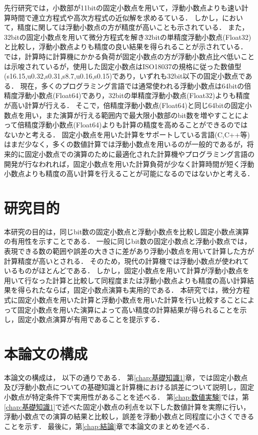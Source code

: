 先行研究では，小数部が11bitの固定小数点を用いて，浮動小数点よりも速い計算時間で連立方程式や高次方程式の近似解を求めるている\cite{IJERTV12IS010134}．
しかし，\cite{IJERTV12IS010134}において，精度に関しては浮動小数点の方が精度が高いことも示されている．
また，32bitの固定小数点を用いて微分方程式を解き32bitの単精度浮動小数点(Float32)と比較し，浮動小数点よりも精度の良い結果を得られることが示されている\cite{hopkins2020stochastic}．
\cite{hopkins2020stochastic}では，計算時に計算機にかかる負荷が固定小数点の方が浮動小数点比べ低いことは示唆されているが，使用した固定小数点はISO18037の規格に従った数値型(s16.15,u0.32,s0.31,s8.7,u0.16,s0.15)であり，いずれも32bit以下の固定小数点である．
現在，多くのプログラミング言語では通常使われる浮動小数点は64bitの倍精度浮動小数点(Float64)であり，32bitの単精度浮動小数点(Float32)よりも精度が高い計算が行える．
そこで，倍精度浮動小数点(Float64)と同じ64bitの固定小数点を用い，また演算が行える範囲内で最大限小数部のbit数を増やすことによって倍精度浮動小数点(Float64)よりも計算の精度を高めることができるのではないかと考える．
固定小数点を用いた計算をサポートしている言語(C,C++等)はまだ少なく，多くの数値計算では浮動小数点を用いるのが一般的であるが，将来的に固定小数点での演算のために最適化された計算機やプログラミング言語の開発が行なわれれば，固定小数点を用いた計算負荷が少なく計算時間が短く浮動小数点よりも精度の高い計算を行えることが可能になるのではないかと考える．

\section{研究目的}
本研究の目的は，同じbit数の固定小数点と浮動小数点を比較し固定小数点演算の有用性を示すことである．
一般に同じbit数の固定小数点と浮動小数点では，表現できる数の範囲や誤差の大きさに差があり浮動小数点を用いて計算した方が計算精度が高いとされる．
そのため，現代の計算機では浮動小数点が使われているものがほとんどである．
しかし，固定小数点を用いて計算が浮動小数点を用いて行なった計算と比較して同程度または浮動小数点よりも精度の高い計算結果を得られたならば，固定小数点演算も実用的である．
本研究では，微分方程式に固定小数点を用いた計算と浮動小数点を用いた計算を行い比較することによって固定小数点を用いた演算によって高い精度の計算結果が得られることを示し，固定小数点演算が有用であることを提示する．

\section{本論文の構成}
本論文の構成は， 以下の通りである．
第\ref{chap:基礎知識1}章，では固定小数点及び浮動小数点についての基礎知識と計算機における誤差について説明し，固定小数点が特定条件下で実用性があることを述べる．
第\ref{chap:数値実験}では，第\ref{chap:基礎知識1}で述べた固定小数点の利点を以下した数値計算を実際に行い，浮動小数点での演算の結果と比較し，誤差を浮動小数点と同程度に小さくできることを示す．
最後に，第\ref{chap:結論}章で本論文のまとめを述べる．
